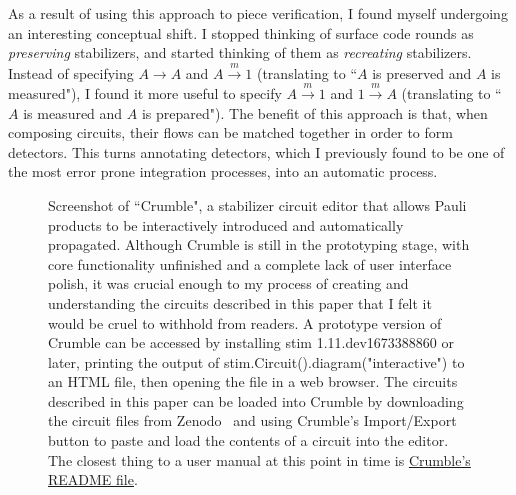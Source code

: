 \documentclass[onecolumn,unpublished,a4paper]{quantumarticle}
\theoremstyle{definition}
\theoremstyle{definition}
\theoremstyle{definition}
\begin{document}
As a result of using this approach to piece verification, I found myself undergoing an interesting conceptual shift.
I stopped thinking of surface code rounds as \emph{preserving} stabilizers, and started thinking of them as \emph{recreating} stabilizers.
Instead of specifying $A \rightarrow A$ and $A \xrightarrow{m} 1$ (translating to ``$A$ is preserved and $A$ is measured"), I found it more useful to specify $A \xrightarrow{m} 1$ and $1 \xrightarrow{m} A$ (translating to ``$A$ is measured and $A$ is prepared").
The benefit of this approach is that, when composing circuits, their flows can be matched together in order to form detectors.
This turns annotating detectors, which I previously found to be one of the most error prone integration processes, into an automatic process.

\begin{figure}[h]
    \centering
    \caption{
        Screenshot of ``Crumble", a stabilizer circuit editor that allows Pauli products to be interactively introduced and automatically propagated.
        Although Crumble is still in the prototyping stage, with core functionality unfinished and a complete lack of user interface polish, it was crucial enough to my process of creating and understanding the circuits described in this paper that I felt it would be cruel to withhold from readers.
        A prototype version of Crumble can be accessed by installing stim 1.11.dev1673388860 or later, printing the output of stim.Circuit().diagram("interactive") to an HTML file, then opening the file in a web browser.
        The circuits described in this paper can be loaded into Crumble by downloading the circuit files from Zenodo~\cite{gidneyybasisdata2022} and using Crumble's Import/Export button to paste and load the contents of a circuit into the editor.
        The closest thing to a user manual at this point in time is \href{https://github.com/quantumlib/Stim/blob/main/glue/crumble/README.md}{Crumble's README file}.
    }
    \label{fig:crumble}
\end{figure}
\end{document}

